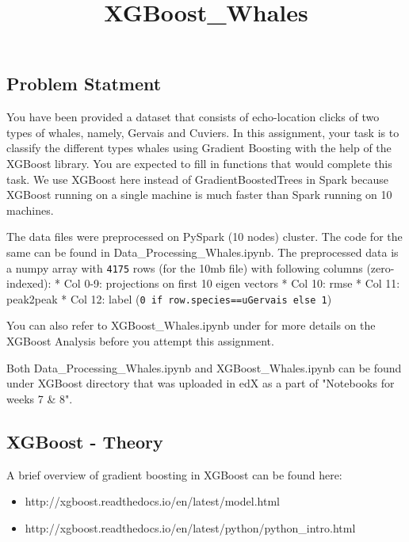 \documentclass[11pt]{article}
\title{XGBoost\_Whales}
\providecommand{\tightlist}{%
      \setlength{\itemsep}{0pt}\setlength{\parskip}{0pt}}
\begin{document}
    
    
    \maketitle
    
    

    
    \subsection{Problem Statment}\label{problem-statment}

You have been provided a dataset that consists of echo-location clicks
of two types of whales, namely, Gervais and Cuviers. In this assignment,
your task is to classify the different types whales using Gradient
Boosting with the help of the XGBoost library. You are expected to fill
in functions that would complete this task. We use XGBoost here instead
of GradientBoostedTrees in Spark because XGBoost running on a single
machine is much faster than Spark running on 10 machines.

The data files were preprocessed on PySpark (10 nodes) cluster. The code
for the same can be found in Data\_Processing\_Whales.ipynb. The
preprocessed data is a numpy array with \texttt{4175} rows (for the 10mb
file) with following columns (zero-indexed): * Col 0-9: projections on
first 10 eigen vectors * Col 10: rmse * Col 11: peak2peak * Col 12:
label
(\texttt{0\ if\ row.species==u\textquotesingle{}Gervais\textquotesingle{}\ else\ 1})

You can also refer to XGBoost\_Whales.ipynb under for more details on
the XGBoost Analysis before you attempt this assignment.

Both Data\_Processing\_Whales.ipynb and XGBoost\_Whales.ipynb can be
found under XGBoost directory that was uploaded in edX as a part of
"Notebooks for weeks 7 \& 8".

    \subsection{XGBoost - Theory}\label{xgboost---theory}

A brief overview of gradient boosting in XGBoost can be found here:

\begin{itemize}
\tightlist
\item
  http://xgboost.readthedocs.io/en/latest/model.html
\item
  http://xgboost.readthedocs.io/en/latest/python/python\_intro.html
\end{itemize}
\end{document}
